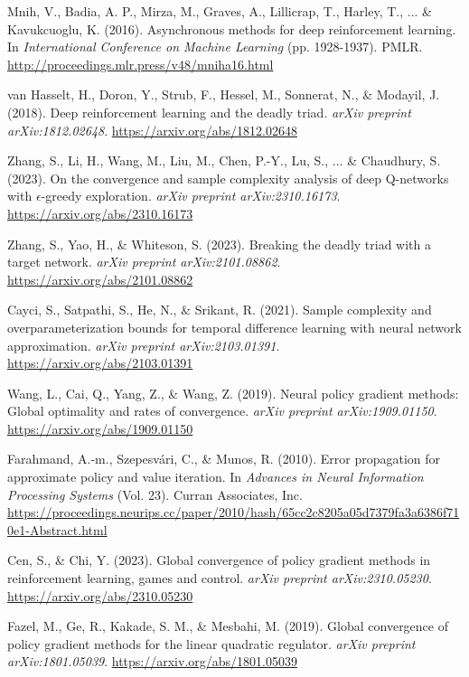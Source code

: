 \documentclass[12pt,a4paper]{report}
\begin{document}
\begin{thebibliography}{99}
Mnih, V., Badia, A. P., Mirza, M., Graves, A., Lillicrap, T., Harley, T., ... \& Kavukcuoglu, K. (2016).
Asynchronous methods for deep reinforcement learning.
In \textit{International Conference on Machine Learning} (pp. 1928-1937). PMLR.
\url{http://proceedings.mlr.press/v48/mniha16.html}


van Hasselt, H., Doron, Y., Strub, F., Hessel, M., Sonnerat, N., \& Modayil, J. (2018).
Deep reinforcement learning and the deadly triad.
\textit{arXiv preprint arXiv:1812.02648}.
\url{https://arxiv.org/abs/1812.02648}

Zhang, S., Li, H., Wang, M., Liu, M., Chen, P.-Y., Lu, S., ... \& Chaudhury, S. (2023).
On the convergence and sample complexity analysis of deep Q-networks with $\epsilon$-greedy exploration.
\textit{arXiv preprint arXiv:2310.16173}.
\url{https://arxiv.org/abs/2310.16173}

Zhang, S., Yao, H., \& Whiteson, S. (2023).
Breaking the deadly triad with a target network.
\textit{arXiv preprint arXiv:2101.08862}.
\url{https://arxiv.org/abs/2101.08862}

Cayci, S., Satpathi, S., He, N., \& Srikant, R. (2021).
Sample complexity and overparameterization bounds for temporal difference learning with neural network approximation.
\textit{arXiv preprint arXiv:2103.01391}.
\url{https://arxiv.org/abs/2103.01391}

Wang, L., Cai, Q., Yang, Z., \& Wang, Z. (2019).
Neural policy gradient methods: Global optimality and rates of convergence.
\textit{arXiv preprint arXiv:1909.01150}.
\url{https://arxiv.org/abs/1909.01150}

Farahmand, A.-m., Szepesvári, C., \& Munos, R. (2010).
Error propagation for approximate policy and value iteration.
In \textit{Advances in Neural Information Processing Systems} (Vol. 23). Curran Associates, Inc.
\url{https://proceedings.neurips.cc/paper/2010/hash/65cc2c8205a05d7379fa3a6386f710e1-Abstract.html}

Cen, S., \& Chi, Y. (2023).
Global convergence of policy gradient methods in reinforcement learning, games and control.
\textit{arXiv preprint arXiv:2310.05230}.
\url{https://arxiv.org/abs/2310.05230}

Fazel, M., Ge, R., Kakade, S. M., \& Mesbahi, M. (2019).
Global convergence of policy gradient methods for the linear quadratic regulator.
\textit{arXiv preprint arXiv:1801.05039}.
\url{https://arxiv.org/abs/1801.05039}


\end{thebibliography}
\end{document}
